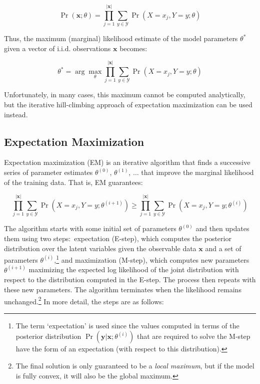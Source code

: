 \begin{equation}
\Pr(\textbf{x};\theta) = \prod_{j=1}^{|\textbf{x}|} \sum_{y \in \mathcal{Y}} \Pr(X=x_j,Y=y ; \theta)
\end{equation}

\noindent Thus, the maximum (marginal) likelihood estimate of the
model parameters $\theta^*$ given a vector of i.i.d. observations
$\textbf{x}$ becomes:

\begin{equation}
\theta^* = \arg \max_{\theta} \prod_{j=1}^{|\textbf{x}|} \sum_{y \in \mathcal{Y}} \Pr(X=x_j,Y=y ; \theta)
\end{equation}

\noindent Unfortunately, in many cases, this maximum cannot be
computed analytically, but the iterative hill-climbing approach of
expectation maximization can be used instead.

\subsection{Expectation Maximization}

Expectation maximization (EM) is an iterative algorithm that finds a
successive series of parameter estimates $\theta^{(0)}$,
$\theta^{(1)}$, $\ldots$ that improve the marginal likelihood of the
training data.  That is, EM guarantees:

\begin{equation}
\prod_{j=1}^{|\textbf{x}|} \sum_{y \in \mathcal{Y}} \Pr(X=x_j,Y=y ; \theta^{(i+1)}) \ge \prod_{j=1}^{|\textbf{x}|} \sum_{y \in \mathcal{Y}} \Pr(X=x_j,Y=y ; \theta^{(i)})
\end{equation}

\noindent The algorithm starts with some initial set of parameters
$\theta^{(0)}$ and then updates them using two steps:\ expectation
(E-step), which computes the posterior distribution over the latent
variables given the observable data $\textbf{x}$ and a set of
parameters $\theta^{(i)}$,\footnote{The term `expectation' is used
  since the values computed in terms of the posterior distribution
  $\Pr(\textbf{y}|\textbf{x};\theta^{(i)})$ that are required to solve
  the M-step have the form of an expectation (with respect to this
  distribution).} and maximization (M-step), which computes new
parameters $\theta^{(i+1)}$ maximizing the expected log likelihood of
the joint distribution with respect to the distribution computed in
the E-step.  The process then repeats with these new parameters.  The
algorithm terminates when the likelihood remains
unchanged.\footnote{The final solution is only guaranteed to be a
  \emph{local maximum}, but if the model is fully convex, it will also
  be the global maximum.} In more detail, the steps are as follows:

